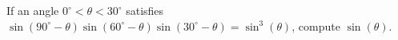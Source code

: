 If an angle $0^\circ<\theta<30^\circ$ satisfies $\sin\left(90^\circ-\theta\right)\sin\left(60^\circ-\theta\right)\sin\left(30^\circ-\theta\right)=\sin^3\left(\theta\right)$, compute $\sin\left(\theta\right)$.